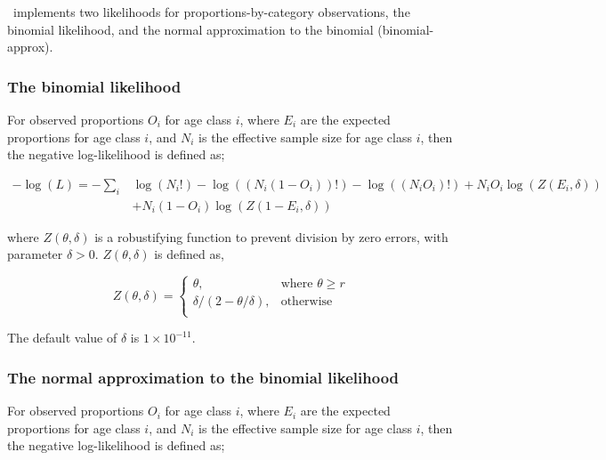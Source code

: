 \SPM\ implements two likelihoods for proportions-by-category observations, the binomial likelihood, and the normal approximation to the binomial (binomial-approx). 

\subsubsection*{The binomial likelihood}

For observed proportions $O_i$ for age class $i$, where $E_i$ are the expected proportions for age class $i$, and $N_i$ is the effective sample size for age class $i$, then the negative log-likelihood is defined as;  

\begin{equation}
  \begin{split}
    -\log \left(L \right)= -\sum\limits_i & \log \left(N_i! \right) - \log \left(\left(N_i \left(1 - O_i \right) \right)! \right) - \log \left(\left(N_i O_i \right)! \right) + N_i O_i \log \left(Z\left(E_i,\delta \right) \right) \\
    &+ N_i \left(1 - O_i \right)\log \left(Z\left(1 - E_i,\delta\right) \right)
  \end{split}
\end{equation}


where $Z \left(\theta,\delta \right)$ is a robustifying function to prevent division by zero errors, with parameter $\delta>0$. $Z \left(\theta,\delta \right)$ is defined as,

\begin{equation}
   Z \left(\theta,\delta \right) = \begin{cases}
	  \theta, & \text{where $\theta \ge r$} \\
	  \delta/\left( 2-\theta/\delta \right), & \text{otherwise} \\  
  \end{cases}
\end{equation}

The default value of $\delta$ is $1 \times 10^{-11}$.

\subsubsection*{The normal approximation to the binomial likelihood}

For observed proportions $O_i$ for age class $i$, where $E_i$ are the expected proportions for age class $i$, and $N_i$ is the effective sample size for age class $i$, then the negative log-likelihood is defined as;  

